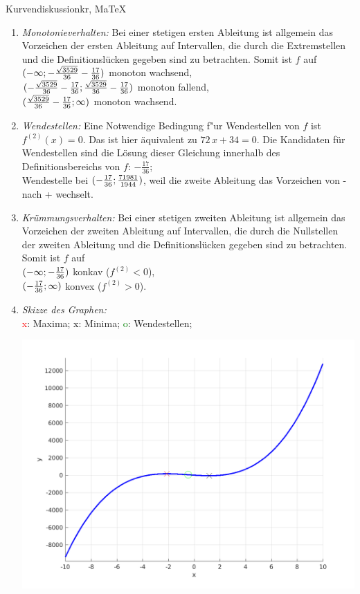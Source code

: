 \begin{MAufgabe}{Kurvendiskussion}{kr, MaTeX}
\begin{enumerate}
 \item \emph{Monotonieverhalten:} 
 Bei einer stetigen ersten Ableitung ist allgemein das Vorzeichen der ersten Ableitung auf Intervallen, die durch die Extremstellen und die Definitionsl\"ucken gegeben sind zu betrachten. Somit ist $f$ auf \\ 
 $(-\infty; - \frac{\sqrt{3529}}{36} - \frac{17}{36})$ monoton wachsend, \\ 
 $( - \frac{\sqrt{3529}}{36} - \frac{17}{36};\frac{\sqrt{3529}}{36} - \frac{17}{36})$ monoton  fallend, \\ 
 $(\frac{\sqrt{3529}}{36} - \frac{17}{36}; \infty)$ monoton wachsend. \\ 
 \item \emph{Wendestellen:} 
 Eine Notwendige Bedingung f"ur Wendestellen von $f$ ist $f^{(2)}(x)=0$. 
 Das ist hier \"aquivalent zu $72\, x + 34=0$. 
 Die Kandidaten f\"ur Wendestellen sind die L\"osung dieser Gleichung innerhalb des Definitionsbereichs von $f$: $- \frac{17}{36}$; \\ 
 Wendestelle bei $(- \frac{17}{36};\frac{71981}{1944})$, weil die zweite Ableitung das Vorzeichen von - nach + wechselt. \\ 
 \item \emph{Kr\"ummungsverhalten:} 
 Bei einer stetigen zweiten Ableitung ist allgemein das Vorzeichen der zweiten Ableitung auf Intervallen, die durch die Nullstellen der zweiten Ableitung und die Definitionsl\"ucken gegeben sind zu betrachten. 
 Somit ist $f$ auf \\ 
 $(-\infty ;- \frac{17}{36})$  konkav ($f^{(2)}<0$), \\ 
 $(- \frac{17}{36}; \infty)$  konvex ($f^{(2)}>0$). \\ 
 \item \emph{Skizze des Graphen:} \\ 
 {\textcolor{red} x}: Maxima; {\textcolor{black} x}: Minima; {\textcolor{green} o}: Wendestellen; 
  \begin{center}
  \includegraphics[width=0.8\linewidth]{Abb_zur_Ag_autogenerated_fractions_17.png} \end{center}
  
 \end{enumerate}
 \else\relax\fi
  \end{MAufgabe}
